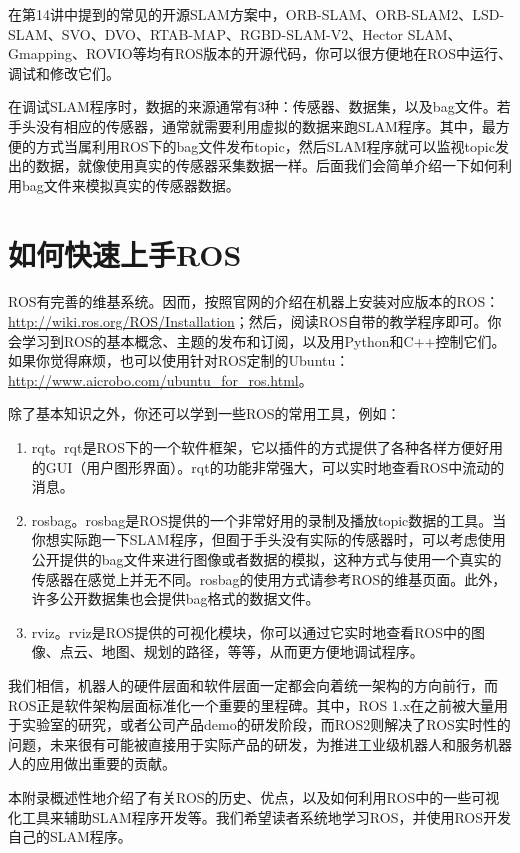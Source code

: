 在第14讲中提到的常见的开源SLAM方案中，ORB-SLAM、ORB-SLAM2、LSD-SLAM、SVO、DVO、RTAB-MAP、RGBD-SLAM-V2、Hector SLAM、Gmapping、ROVIO等均有ROS版本的开源代码，你可以很方便地在ROS中运行、调试和修改它们。

在调试SLAM程序时，数据的来源通常有3种：传感器、数据集，以及bag文件。若手头没有相应的传感器，通常就需要利用虚拟的数据来跑SLAM程序。其中，最方便的方式当属利用ROS下的bag文件发布topic，然后SLAM程序就可以监视topic发出的数据，就像使用真实的传感器采集数据一样。后面我们会简单介绍一下如何利用bag文件来模拟真实的传感器数据。

\enlargethispage{5pt}
\section{如何快速上手ROS}
ROS有完善的维基系统。因而，按照官网的介绍在机器上安装对应版本的ROS：\url{http://wiki.ros.org/ROS/Installation}；然后，阅读ROS自带的教学程序即可。你会学习到ROS的基本概念、主题的发布和订阅，以及用Python和C++控制它们。如果你觉得麻烦，也可以使用针对ROS定制的Ubuntu：\url{http://www.aicrobo.com/ubuntu_for_ros.html}。

除了基本知识之外，你还可以学到一些ROS的常用工具，例如：

\begin{enumerate}
	\item rqt。rqt是ROS下的一个软件框架，它以插件的方式提供了各种各样方便好用的GUI（用户图形界面）。rqt的功能非常强大，可以实时地查看ROS中流动的消息。
	\item rosbag。rosbag是ROS提供的一个非常好用的录制及播放topic数据的工具。当你想实际跑一下SLAM程序，但囿于手头没有实际的传感器时，可以考虑使用公开提供的bag文件来进行图像或者数据的模拟，这种方式与使用一个真实的传感器在感觉上并无不同。rosbag的使用方式请参考ROS的维基页面。此外，许多公开数据集也会提供bag格式的数据文件。
	\item rviz。rviz是ROS提供的可视化模块，你可以通过它实时地查看ROS中的图像、点云、地图、规划的路径，等等，从而更方便地调试程序。
\end{enumerate}

我们相信，机器人的硬件层面和软件层面一定都会向着统一架构的方向前行，而ROS正是软件架构层面标准化一个重要的里程碑。其中，ROS 1.x在之前被大量用于实验室的研究，或者公司产品demo的研发阶段，而ROS2则解决了ROS实时性的问题，未来很有可能被直接用于实际产品的研发，为推进工业级机器人和服务机器人的应用做出重要的贡献。

本附录概述性地介绍了有关ROS的历史、优点，以及如何利用ROS中的一些可视化工具来辅助SLAM程序开发等。我们希望读者系统地学习ROS，并使用ROS开发自己的SLAM程序。